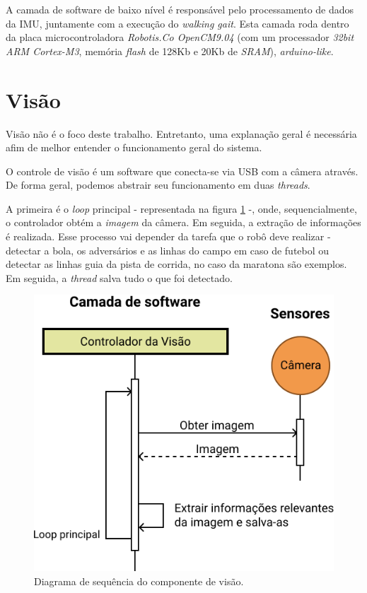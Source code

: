 A camada de software de baixo nível é responsável pelo processamento de dados da IMU, juntamente com a execução do \textit{walking gait}. Esta camada roda dentro da placa microcontroladora \textit{Robotis.Co OpenCM9.04} (com um processador \textit{32bit ARM Cortex-M3}, memória \textit{flash} de 128Kb e 20Kb de \textit{SRAM}), \textit{arduino-like}.

\section{Visão}

Visão não é o foco deste trabalho. Entretanto, uma explanação geral é necessária afim de melhor entender o funcionamento geral do sistema.

O controle de visão é um software que conecta-se via USB com a câmera através. De forma geral, podemos abstrair seu funcionamento em duas \textit{threads}.

A primeira é o \textit{loop} principal - representada na figura \ref{fig:SoftwareArchitecture:Vision} -, onde, sequencialmente, o controlador obtém a \textit{imagem} da câmera. Em seguida, a extração de informações é realizada. Esse processo vai depender da tarefa que o robô deve realizar - detectar a bola, os adversários e as linhas do campo em caso de futebol ou detectar as linhas guia da pista de corrida, no caso da maratona são exemplos. Em seguida, a \textit{thread} salva tudo o que foi detectado.

\begin{figure}[h!]
	\centering
	\includegraphics[scale=1]{imagens/svg/softwarearchitecture-vision}
	\caption{Diagrama de sequência do componente de visão.}
	\label{fig:SoftwareArchitecture:Vision}
\end{figure}

